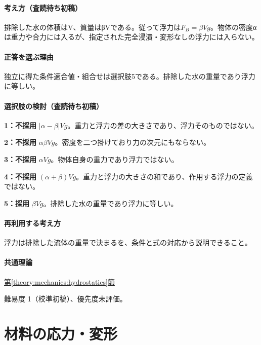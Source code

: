 \paragraph{考え方（査読待ち初稿）} 排除した水の体積はV、質量はβVである。従って浮力は\(F_B=\beta Vg\)。物体の密度αは重力や合力には入るが、指定された完全浸漬・変形なしの浮力には入らない。

\paragraph{正答を選ぶ理由} 独立に得た条件適合値・組合せは選択肢5である。排除した水の重量であり浮力に等しい。

\paragraph{選択肢の検討（査読待ち初稿）}

\noindent\textbf{1：不採用} \(|\alpha-\beta|Vg\)。重力と浮力の差の大きさであり、浮力そのものではない。\par

\noindent\textbf{2：不採用} \(\alpha\beta Vg\)。密度を二つ掛けており力の次元にもならない。\par

\noindent\textbf{3：不採用} \(\alpha Vg\)。物体自身の重力であり浮力ではない。\par

\noindent\textbf{4：不採用} \((\alpha+\beta)Vg\)。重力と浮力の大きさの和であり、作用する浮力の定義ではない。\par

\noindent\textbf{5：採用} \(\beta Vg\)。排除した水の重量であり浮力に等しい。\par

\paragraph{再利用する考え方} 浮力は排除した流体の重量で決まるを、条件と式の対応から説明できること。

\paragraph{共通理論} \hyperref[theory:mechanics:hydrostatics]{第\ref*{theory:mechanics:hydrostatics}節}

\par 難易度 1（校準初稿）、優先度未評価。

\section{材料の応力・変形}

